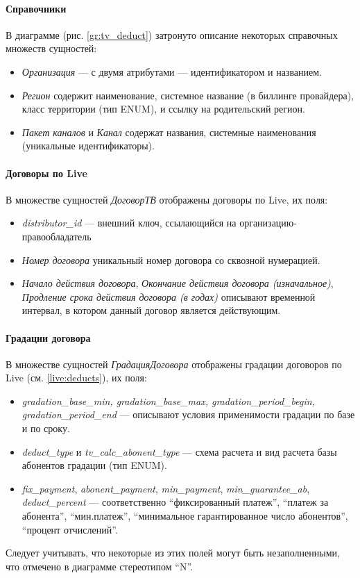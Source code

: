 \paragraph{Справочники} В диаграмме (рис. \ref{gr:tv_deduct}) затронуто описание некоторых справочных
множеств сущностей:
\begin{itemize}
\item{
  \textit{Организация} --- с двумя атрибутами --- идентификатором и названием.
}
\item{
  \textit{Регион} содержит наименование, системное название (в биллинге провайдера), класс территории (тип ENUM),
  и ссылку на родительский регион.
}
\item{
  \textit{Пакет каналов} и \textit{Канал} содержат названия, системные наименования (уникальные идентификаторы).
}
\end{itemize} 

\paragraph{Договоры по Live} В множестве сущностей \textit{ДоговорТВ} отображены договоры по Live, их поля:
\begin{itemize}
\item{
  \textit{distributor\_id} --- внешний ключ, ссылающийся на организацию-правообладатель
}
\item{
  \textit{Номер договора} уникальный номер договора со сквозной нумерацией.
}
\item{
  \textit{Начало действия договора}, \textit{Окончание действия договора (изначальное)}, \textit{Продление срока действия договора (в годах)}
 описывают временной интервал, в котором данный договор является действующим.
}
\end{itemize}

\paragraph{Градации договора} В множестве сущностей \textit{ГрадацияДоговора} отображены градации договоров по Live (см. \ref{live:deducts}), их поля:
\begin{itemize}
\item{
  \textit{gradation\_base\_min, gradation\_base\_max, gradation\_period\_begin, gradation\_period\_end}  
    --- описывают условия применимости градации по базе и по сроку.
}
\item{
  \textit{deduct\_type} и \textit{tv\_calc\_abonent\_type} --- схема расчета и вид расчета базы абонентов градации (тип ENUM).
}
\item{
  \textit{fix\_payment}, \textit{abonent\_payment}, \textit{min\_payment}, \textit{min\_guarantee\_ab},
  \textit{deduct\_percent} --- соответственно ``фиксированный платеж'', ``платеж за абонента'', ``мин.платеж'',
  ``минимальное гарантированное число абонентов'', ``процент отчислений''.
}
\end{itemize}
Следует учитывать, что некоторые из этих полей могут быть незаполненными, что отмечено в диаграмме стереотипом ``N''.

